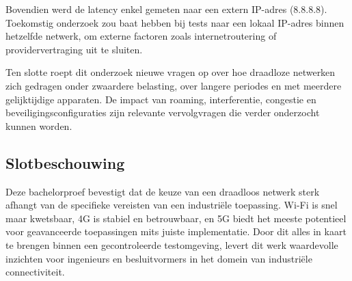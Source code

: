 Bovendien werd de latency enkel gemeten naar een extern IP-adres (8.8.8.8). Toekomstig onderzoek zou baat hebben bij tests naar een lokaal IP-adres binnen hetzelfde netwerk, om externe factoren zoals internetroutering of providervertraging uit te sluiten.

Ten slotte roept dit onderzoek nieuwe vragen op over hoe draadloze netwerken zich gedragen onder zwaardere belasting, over langere periodes en met meerdere gelijktijdige apparaten. De impact van roaming, interferentie, congestie en beveiligingsconfiguraties zijn relevante vervolgvragen die verder onderzocht kunnen worden.

\subsection{Slotbeschouwing}

Deze bachelorproef bevestigt dat de keuze van een draadloos netwerk sterk afhangt van de specifieke vereisten van een industriële toepassing. Wi-Fi is snel maar kwetsbaar, 4G is stabiel en betrouwbaar, en 5G biedt het meeste potentieel voor geavanceerde toepassingen mits juiste implementatie. Door dit alles in kaart te brengen binnen een gecontroleerde testomgeving, levert dit werk waardevolle inzichten voor ingenieurs en besluitvormers in het domein van industriële connectiviteit.


